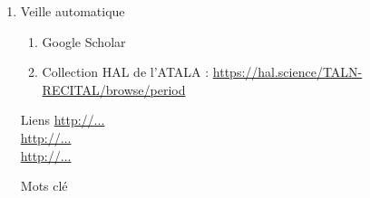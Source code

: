 \documentclass{book}
\newenvironment{titlemize}[1]{%
  \paragraph{#1}
  \begin{itemize}}
  {\end{itemize}}
\begin{document}
\begin{enumerate}
\begin{titlemize}{La conférence JEP-TALN RECITAL}
                \item Elle est l'occasion de réunir chercheurs et industriels, juniors et expérimentés autour des problématiques actuelles du TAL.
                \item Liens vers les actes publiés chaque année : \url{https://www.atala.org/index.php/-Conference-TALN-RECITAL} 
            \end{titlemize}
            \begin{titlemize}{La conférence LREC (International Conference on Language Resources and Evaluation) }
                  \item Conférence bianuelle organisée par l'ELRA sur des thématiques transverses informatique/linguistique. 
                  \item organisé par l'ELRA
                  \item Evenement majeur dans le champs de la linguistique computationelle
            \end{titlemize}
            \begin{titlemize}{La conférence ACL}
                \item Edition américaine + européenne chaque année
                \item axée linguistique computationelle
            \end{titlemize}
	\item Veille automatique  
        \begin{enumerate}
            \item Google Scholar
            \item Collection HAL de l'ATALA : \url{https://hal.science/TALN-RECITAL/browse/period}
        \end{enumerate}
        
\end{enumerate}

\begin{itemize}
    \item [Liens]
        \url{http://...}\\
        \url{http://...}\\
        \url{http://...}\\
    \item [Mots clé]
\end{itemize}
\end{document}
